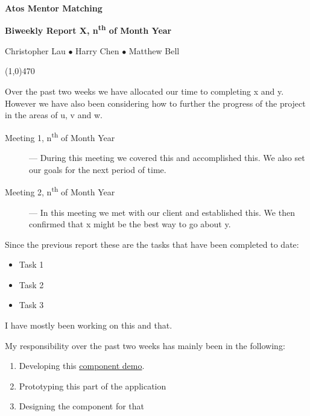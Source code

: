 \documentclass[11pt]{report}
\begin{document}
\centerline{{\LARGE \bf Atos Mentor Matching}}

\centerline{ \large \bf Biweekly Report X, n\textsuperscript{th} of Month Year}
\centerline{ Christopher Lau $\bullet$ Harry Chen $\bullet$ Matthew Bell }
\noindent
\line(1,0){470}\\


\smallskip

\noindent
Over the past two weeks we have allocated our time to completing x and y. \\

\noindent
However we have also been considering how to further the progress of the project in the areas of u, v and w. \\

\bigskip
{}
\smallskip

\begin{description}
  \item[Meeting 1, n\textsuperscript{th} of Month Year] --- During this meeting we covered this and accomplished this. We also set our goals for the next period of time.
  \item[Meeting 2, n\textsuperscript{th} of Month Year] --- In this meeting we met with our client and established this. We then confirmed that x might be the best way to go about y.
\end{description}

\bigskip
{}
\smallskip

\noindent
Since the previous report these are the tasks that have been completed to date:
\begin{itemize}
  \item Task 1
  \item Task 2
  \item Task 3
\end{itemize}

\bigskip
{}
\smallskip

\noindent
I have mostly been working on this and that. \\

\bigskip
{}
\smallskip

\noindent
My responsibility over the past two weeks has mainly been in the following:

\begin{enumerate}
  \item Developing this \href{http://google.com}{component demo}.
  \item Prototyping this part of the application
  \item Designing the component for that
\end{enumerate}
\end{document}
